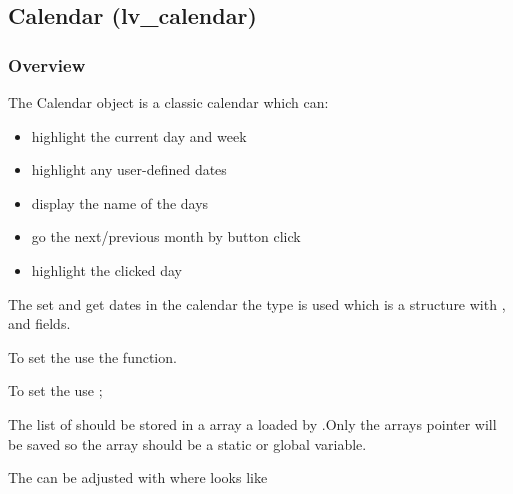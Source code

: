 \documentclass[letterpaper,10pt,english]{sphinxmanual}
\begin{document}
\subsection{Calendar (lv\_calendar)}
\label{\detokenize{object-types/calendar:calendar-lv-calendar}}\label{\detokenize{object-types/calendar::doc}}

\subsubsection{Overview}
\label{\detokenize{object-types/calendar:overview}}
The Calendar object is a classic calendar which can:
\begin{itemize}
\item {} 
highlight the current day and week

\item {} 
highlight any user-defined dates

\item {} 
display the name of the days

\item {} 
go the next/previous month by button click

\item {} 
highlight the clicked day

\end{itemize}

The set and get dates in the calendar the  type is used which is a structure with ,  and  fields.

To set the  use the  function.

To set the  use ;

The list of  should be stored in a  array a loaded by .Only the arrays pointer will be saved so the array should be a static or global variable.

The  can be adjusted with  where  looks like 
\end{document}

